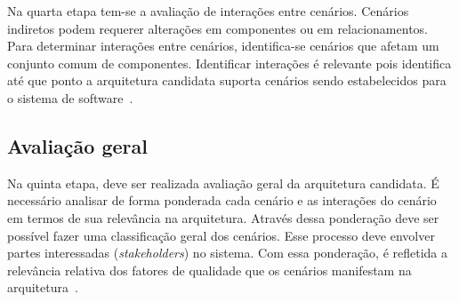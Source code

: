 Na quarta etapa tem-se a avaliação de interações entre cenários. Cenários indiretos podem requerer alterações em componentes ou em relacionamentos. Para determinar interações entre cenários, identifica-se cenários que afetam um conjunto comum de componentes. Identificar interações é relevante pois identifica até que ponto a arquitetura candidata suporta cenários sendo estabelecidos para o sistema de software~\cite{scenario_methods}. 

\subsection{Avaliação geral}

Na quinta etapa, deve ser realizada avaliação geral da arquitetura candidata. É necessário analisar de forma ponderada cada cenário e as interações do cenário em termos de sua relevância na arquitetura. Através dessa ponderação deve ser possível fazer uma classificação geral dos cenários. Esse processo deve envolver partes interessadas (\emph{stakeholders}) no sistema. Com essa ponderação, é refletida a relevância relativa dos fatores de qualidade que os cenários manifestam na arquitetura~\cite{scenario_methods}.
